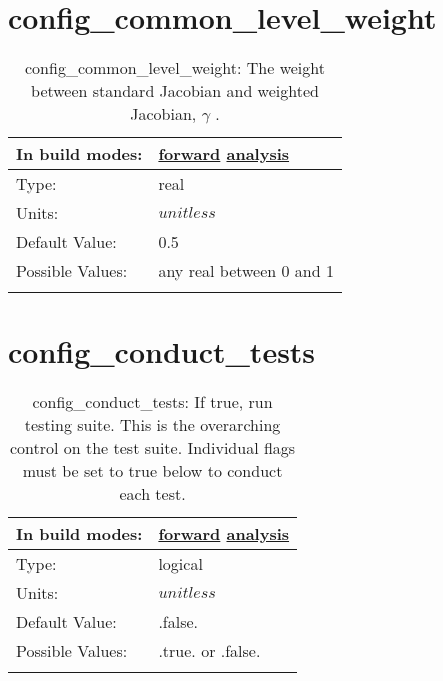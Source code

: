 \section[config\_common\_level\_weight]{config\_common\_level\_weight}
\label{sec:nm_sec_config_common_level_weight}
\begin{center}
\begin{longtable}{| p{2.0in} || p{4.0in} |}
    \hline
    In build modes: & \hyperref[subsec:forward_nm_tab_pressure_gradient]{forward} \hyperref[subsec:analysis_nm_tab_pressure_gradient]{analysis} \\
    \hline
    Type: & real \\
    \hline
    Units: & $unitless$ \\
    \hline
    Default Value: & 0.5 \\
    \hline
    Possible Values: & any real between 0 and 1 \\
    \hline
    \caption{config\_common\_level\_weight:  The weight between standard Jacobian and weighted Jacobian,  $\gamma$ .}
\end{longtable}
\end{center}
\section[config\_conduct\_tests]{config\_conduct\_tests}
\label{sec:nm_sec_config_conduct_tests}
\begin{center}
\begin{longtable}{| p{2.0in} || p{4.0in} |}
    \hline
    In build modes: & \hyperref[subsec:forward_nm_tab_testing]{forward} \hyperref[subsec:analysis_nm_tab_testing]{analysis} \\
    \hline
    Type: & logical \\
    \hline
    Units: & $unitless$ \\
    \hline
    Default Value: & .false. \\
    \hline
    Possible Values: & .true. or .false. \\
    \hline
    \caption{config\_conduct\_tests: If true, run testing suite. This is the overarching control on the test suite. Individual flags must be set to true below to conduct each test.}
\end{longtable}
\end{center}
